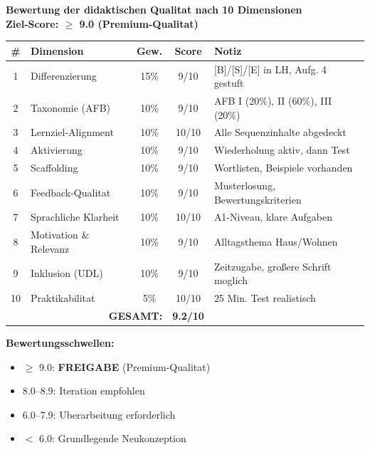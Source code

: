 \documentclass[11pt,a4paper]{article}
\begin{document}
\begin{scorebox}
\textbf{Bewertung der didaktischen Qualitat nach 10 Dimensionen}\\
\textbf{Ziel-Score: $\geq$ 9.0 (Premium-Qualitat)}

\vspace{1em}
\begin{tabular}{|c|l|c|c|p{4.5cm}|}
\hline
\textbf{\#} & \textbf{Dimension} & \textbf{Gew.} & \textbf{Score} & \textbf{Notiz} \\
\hline
1 & Differenzierung & 15\% & 9/10 & [B]/[S]/[E] in LH, Aufg. 4 gestuft \\
\hline
2 & Taxonomie (AFB) & 10\% & 9/10 & AFB I (20\%), II (60\%), III (20\%) \\
\hline
3 & Lernziel-Alignment & 10\% & 10/10 & Alle Sequenzinhalte abgedeckt \\
\hline
4 & Aktivierung & 10\% & 9/10 & Wiederholung aktiv, dann Test \\
\hline
5 & Scaffolding & 10\% & 9/10 & Wortlisten, Beispiele vorhanden \\
\hline
6 & Feedback-Qualitat & 10\% & 9/10 & Musterlosung, Bewertungskriterien \\
\hline
7 & Sprachliche Klarheit & 10\% & 10/10 & A1-Niveau, klare Aufgaben \\
\hline
8 & Motivation \& Relevanz & 10\% & 9/10 & Alltagsthema Haus/Wohnen \\
\hline
9 & Inklusion (UDL) & 10\% & 9/10 & Zeitzugabe, großere Schrift moglich \\
\hline
10 & Praktikabilitat & 5\% & 10/10 & 25 Min. Test realistisch \\
\hline
\multicolumn{3}{|r|}{\textbf{GESAMT:}} & \textbf{9.2/10} & \\
\hline
\end{tabular}

\vspace{1em}
\textbf{Bewertungsschwellen:}
\begin{itemize}
    \item[$\boxtimes$] \textcolor{successgreen}{$\geq$ 9.0: \textbf{FREIGABE} (Premium-Qualitat)}
    \item[$\Box$] \textcolor{warningorange}{8.0--8.9: Iteration empfohlen}
    \item[$\Box$] 6.0--7.9: Uberarbeitung erforderlich
    \item[$\Box$] $<$ 6.0: Grundlegende Neukonzeption
\end{itemize}
\end{scorebox}
\end{document}
